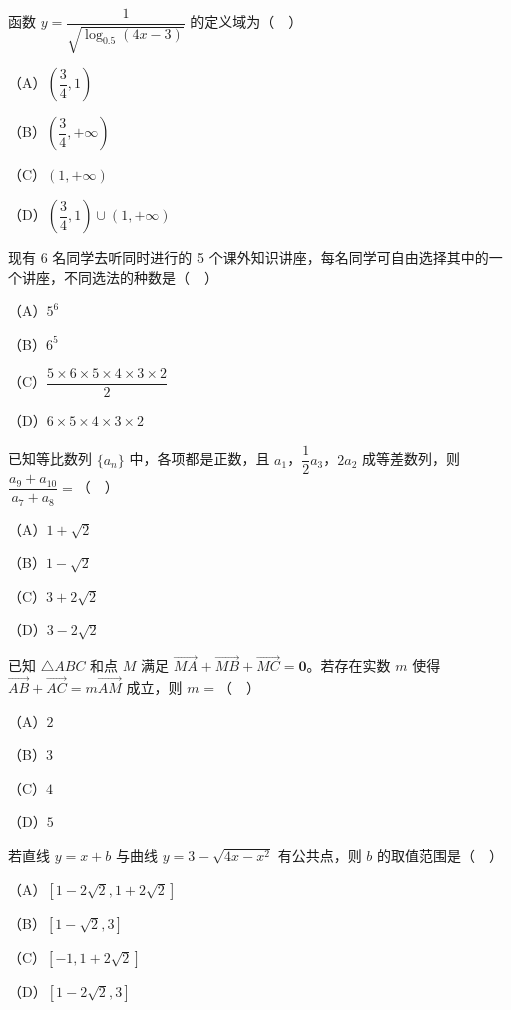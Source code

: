\begin{question}
函数 $y=\dfrac{1}{\sqrt{\log_{0.5}(4x-3)}}$ 的定义域为（　）

（A）$\left(\dfrac34,1\right)$

（B）$\left(\dfrac34,+\infty\right)$

（C）$(1,+\infty)$

（D）$\left(\dfrac34,1\right)\cup(1,+\infty)$

\end{question}
\begin{question}
现有 6 名同学去听同时进行的 5 个课外知识讲座，每名同学可自由选择其中的一个讲座，不同选法的种数是（　）

（A）$5^6$

（B）$6^5$

（C）$\dfrac{5\times6\times5\times4\times3\times2}{2}$

（D）$6\times5\times4\times3\times2$

\end{question}
\begin{question}
已知等比数列 $\{a_n\}$ 中，各项都是正数，且 $a_1$，$\dfrac12a_3$，$2a_2$ 成等差数列，则 $\dfrac{a_9+a_{10}}{a_7+a_8}=$（　）

（A）$1+\sqrt2$

（B）$1-\sqrt2$

（C）$3+2\sqrt2$

（D）$3-2\sqrt2$

\end{question}
\begin{question}
已知 $\triangle ABC$ 和点 $M$ 满足 $\overrightarrow{MA}+\overrightarrow{MB}+\overrightarrow{MC}=\mathbf 0$。若存在实数 $m$ 使得 $\overrightarrow{AB}+\overrightarrow{AC}=m\overrightarrow{AM}$ 成立，则 $m=$（　）

（A）$2$

（B）$3$

（C）$4$

（D）$5$

\end{question}
\begin{question}
若直线 $y=x+b$ 与曲线 $y=3-\sqrt{4x-x^2}$ 有公共点，则 $b$ 的取值范围是（　）

（A）$[1-2\sqrt2,1+2\sqrt2]$

（B）$[1-\sqrt2,3]$

（C）$[-1,1+2\sqrt2]$

（D）$[1-2\sqrt2,3]$

\end{question}
